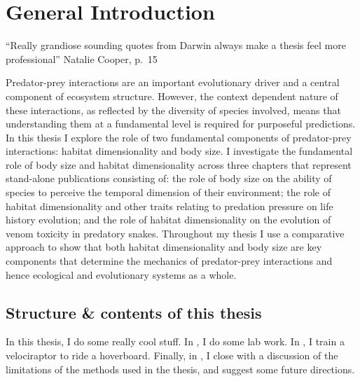 \chapter{General Introduction}
\label{chap:introduction}%

\begin{quoteshrink}
  ``Really grandiose sounding quotes from Darwin always make a thesis feel more professional''
  \hfill{Natalie Cooper, p.~15}
\end{quoteshrink}

\noindent
Predator-prey interactions are an important evolutionary driver and a central component of ecosystem structure. However, the context dependent nature of these interactions, as reflected by the diversity of species involved, means that understanding them at a fundamental level is required for purposeful predictions. In this thesis I explore the role of two fundamental components of predator-prey interactions: habitat dimensionality and body size. I investigate the fundamental role of body size and habitat dimensionality across three chapters that represent stand-alone publications consisting of: the role of body size on the ability of species to perceive the temporal dimension of their environment; the role of habitat dimensionality and other traits relating to predation pressure on life history evolution; and the role of habitat dimensionality on the evolution of venom toxicity in predatory snakes. Throughout my thesis I use a comparative approach to show that both habitat dimensionality and body size are key components that determine the mechanics of predator-prey interactions and hence ecological and evolutionary systems as a whole.


\section{Structure \& contents of this thesis}
In this thesis, I do some really cool stuff.
%
In , I do some lab work.
%
In , I train a velociraptor to ride a hoverboard.
%
%
Finally, in , I close with a discussion of the
limitations of the methods used in the thesis, and suggest some future
directions.

